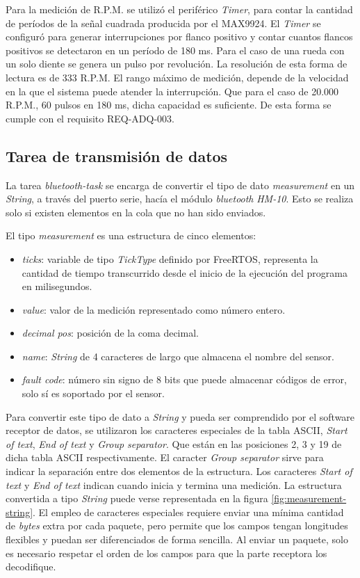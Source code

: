 Para la medición de R.P.M. se utilizó el periférico \textit{Timer}, para contar la cantidad de períodos de la señal cuadrada producida por el MAX9924. El \textit{Timer} se configuró para generar interrupciones por flanco positivo y contar cuantos flancos positivos se detectaron en un período de 180 ms. Para el caso de una rueda con un solo diente se genera un pulso por revolución. La resolución de esta forma de lectura es de 333 R.P.M. El rango máximo de medición, depende de la velocidad en la que el sistema puede atender la interrupción. Que para el caso de 20.000 R.P.M., 60 pulsos en 180 ms, dicha capacidad es suficiente. De esta forma se cumple con el requisito REQ-ADQ-003.

\subsection{Tarea de transmisión de datos}

La tarea \textit{bluetooth-task} se encarga de convertir el tipo de dato \textit{measurement} en un \textit{String}, a través del puerto serie, hacía el módulo \textit{bluetooth} \textit{HM-10}. Esto se realiza solo si existen elementos en la cola que no han sido enviados.

El tipo \textit{measurement} es una estructura de cinco elementos:

\begin{itemize}
\item{\textit{ticks}:} variable de tipo \textit{TickType} definido por FreeRTOS, representa la cantidad de tiempo transcurrido desde el inicio de la ejecución del programa en milisegundos.
\item{\textit{value}:} valor de la medición representado como número entero.
\item{\textit{decimal pos}:} posición de la coma decimal.
\item{\textit{name}:} \textit{String} de 4 caracteres de largo que almacena el nombre del sensor.
\item{\textit{fault code}:} número sin signo de 8 bits que puede almacenar códigos de error, solo sí es soportado por el sensor.
\end{itemize}

Para convertir este tipo de dato a \textit{String} y pueda ser comprendido por el software receptor de datos, se utilizaron los caracteres especiales de la tabla ASCII, \textit{Start of text}, \textit{End of text} y \textit{Group separator}. Que están en las posiciones 2, 3 y 19 de dicha tabla ASCII respectivamente. El caracter \textit{Group separator} sirve para indicar la separación entre dos elementos de la estructura. Los caracteres \textit{Start of text} y \textit{End of text} indican cuando inicia y termina una medición. La estructura convertida a tipo \textit{String} puede verse representada en la figura \ref{fig:measurement-string}. El empleo de caracteres especiales requiere enviar una mínima cantidad de \textit{bytes} extra por cada paquete, pero permite que los campos tengan longitudes flexibles y puedan ser diferenciados de forma sencilla. Al enviar un paquete, solo es necesario respetar el orden de los campos para que la parte receptora los decodifique.


